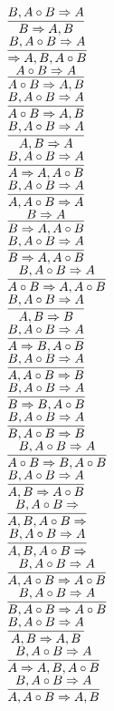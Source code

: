 \documentclass[11pt]{article}
\begin{document}
\begin{center}
\bigskip
\\$\infer{B\Rightarrow A, B}{B, A\circ B\Rightarrow A}$
\bigskip
\\$\infer{\Rightarrow A, B, A\circ B}{B, A\circ B\Rightarrow A}$
\bigskip
\\$\infer{A\circ B\Rightarrow A, B}{A\circ B\Rightarrow A}$
\bigskip
\\$\infer{A\circ B\Rightarrow A, B}{B, A\circ B\Rightarrow A}$
\bigskip
\\$\infer{A, B\Rightarrow A}{B, A\circ B\Rightarrow A}$
\bigskip
\\$\infer{A\Rightarrow A, A\circ B}{B, A\circ B\Rightarrow A}$
\bigskip
\\$\infer{A, A\circ B\Rightarrow A}{B, A\circ B\Rightarrow A}$
\bigskip
\\$\infer{B\Rightarrow A, A\circ B}{B\Rightarrow A}$
\bigskip
\\$\infer{B\Rightarrow A, A\circ B}{B, A\circ B\Rightarrow A}$
\bigskip
\\$\infer{A\circ B\Rightarrow A, A\circ B}{B, A\circ B\Rightarrow A}$
\bigskip
\\$\infer{A, B\Rightarrow B}{B, A\circ B\Rightarrow A}$
\bigskip
\\$\infer{A\Rightarrow B, A\circ B}{B, A\circ B\Rightarrow A}$
\bigskip
\\$\infer{A, A\circ B\Rightarrow B}{B, A\circ B\Rightarrow A}$
\bigskip
\\$\infer{B\Rightarrow B, A\circ B}{B, A\circ B\Rightarrow A}$
\bigskip
\\$\infer{B, A\circ B\Rightarrow B}{B, A\circ B\Rightarrow A}$
\bigskip
\\$\infer{A\circ B\Rightarrow B, A\circ B}{B, A\circ B\Rightarrow A}$
\bigskip
\\$\infer{A, B\Rightarrow A\circ B}{B, A\circ B\Rightarrow A}$
\bigskip
\\$\infer{A, B, A\circ B\Rightarrow }{B, A\circ B\Rightarrow }$
\bigskip
\\$\infer{A, B, A\circ B\Rightarrow }{B, A\circ B\Rightarrow A}$
\bigskip
\\$\infer{A, A\circ B\Rightarrow A\circ B}{B, A\circ B\Rightarrow A}$
\bigskip
\\$\infer{B, A\circ B\Rightarrow A\circ B}{B, A\circ B\Rightarrow A}$
\bigskip
\\$\infer{A, B\Rightarrow A, B}{B, A\circ B\Rightarrow A}$
\bigskip
\\$\infer{A\Rightarrow A, B, A\circ B}{B, A\circ B\Rightarrow A}$
\bigskip
\\$\infer{A, A\circ B\Rightarrow A, B}{B, A\circ B\Rightarrow A}$

\end{center}
\end{document}
